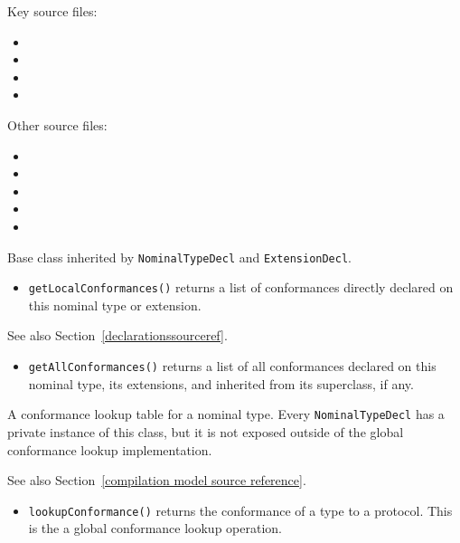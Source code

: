 \documentclass[../generics]{subfiles}
\begin{document}
Key source files:
\begin{itemize}
\item {}
\item {}
\item {}
\item {}
\end{itemize}
Other source files:
\begin{itemize}
\item {}
\item {}
\item {}
\item {}
\item {}
\end{itemize}

Base class inherited by \texttt{NominalTypeDecl} and \texttt{ExtensionDecl}.
\begin{itemize}
\item \texttt{getLocalConformances()} returns a list of conformances directly declared on this nominal type or extension.
\end{itemize}

See also Section~\ref{declarationssourceref}.
\begin{itemize}
\item \texttt{getAllConformances()} returns a list of all conformances declared on this nominal type, its extensions, and inherited from its superclass, if any.
\end{itemize}

A conformance lookup table for a nominal type. Every \texttt{NominalTypeDecl} has a private instance of this class, but it is not exposed outside of the global conformance lookup implementation.

See also Section~\ref{compilation model source reference}.
\begin{itemize}
\item \texttt{lookupConformance()} returns the conformance of a type to a protocol. This is the a global conformance lookup operation.
\end{itemize}
\end{document}
